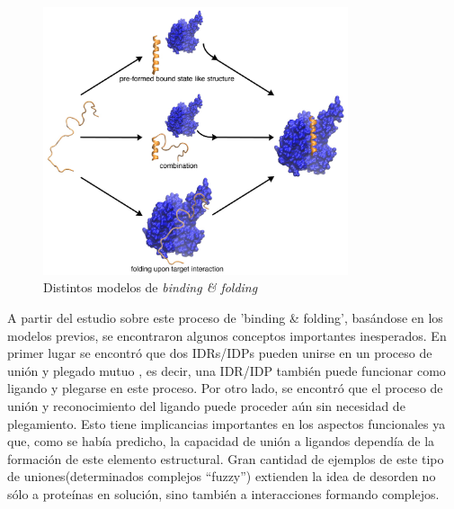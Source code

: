 \begin{figure}[h]
\centering
\includegraphics[width=0.8\textwidth]{img/PSE-MoRE.jpg} 
\caption{Distintos modelos de \textit{binding \& folding}} 
\label{idpBinding}
\end{figure}




A partir del estudio sobre este proceso de 'binding \& folding', basándose en los modelos previos, se encontraron algunos conceptos importantes inesperados.
En primer lugar se encontró que dos IDRs/IDPs pueden unirse en un proceso de unión y plegado mutuo \cite{bhattacherjee2012coupled},
es decir, una IDR/IDP también puede funcionar como ligando y plegarse en este proceso. 
Por otro lado, se encontró que el proceso de unión y reconocimiento del ligando puede proceder aún sin necesidad de plegamiento. 
Esto tiene implicancias importantes en los aspectos funcionales ya que, como se había predicho, la capacidad de unión a ligandos dependía de la formación de este elemento estructural.
Gran cantidad de ejemplos de este tipo de uniones(determinados complejos ``fuzzy'') extienden la idea de desorden no sólo a proteínas en solución, sino también a interacciones formando complejos. 







